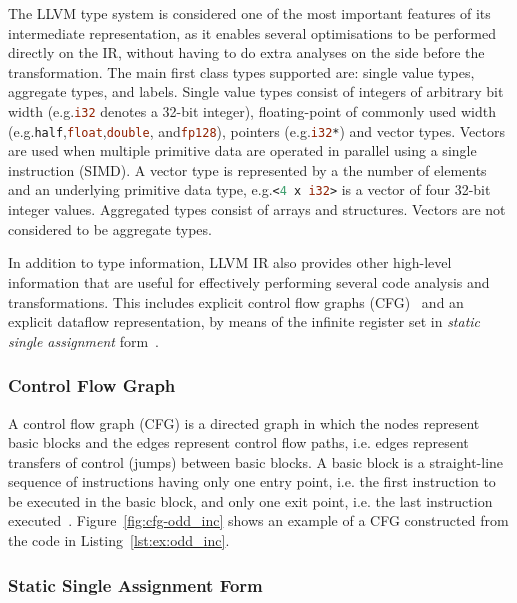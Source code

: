 The LLVM type system is considered one of the most important features of its intermediate representation, as it enables several optimisations to be performed directly on the IR, without having to do extra analyses on the side before the transformation.
The main first class types supported are: single value types, aggregate types, and labels.
Single value types consist of integers of arbitrary bit width (e.g.\lstinline[language=llvm,style=nasm]{i32} denotes a 32-bit integer), floating-point of commonly used width (e.g.\lstinline[language=llvm,style=nasm]{half},\lstinline[language=llvm,style=nasm]{float},\lstinline[language=llvm,style=nasm]{double}, and\lstinline[language=llvm,style=nasm]{fp128}), pointers (e.g.\lstinline[language=llvm,style=nasm]{i32*}) and vector types.
Vectors are used when multiple primitive data are operated in parallel using a single instruction (SIMD).
A vector type is represented by a the number of elements and an underlying primitive data type, e.g.\lstinline[language=llvm,style=nasm]{<4 x i32>} is a vector of four 32-bit integer values.
Aggregated types consist of arrays and structures.
Vectors are not considered to be aggregate types.

In addition to type information, LLVM IR also provides other high-level information that are useful for effectively performing several code analysis and transformations.
This includes explicit control flow graphs (CFG)~\citep{allen70} and an explicit dataflow representation, by means of the infinite register set in \textit{static single assignment} form~\citep{alpern88,cytron89,cytron91}.

\subsubsection{Control Flow Graph}

A control flow graph (CFG) is a directed graph in which the nodes represent basic blocks and the edges represent control flow paths, i.e. edges represent transfers of control (jumps) between basic blocks.
A basic block is a straight-line sequence of instructions having only one entry point, i.e. the first instruction to be executed in the basic block, and only one exit point, i.e. the last instruction executed~\citep{allen70,cytron91}.
Figure~\ref{fig:cfg-odd_inc} shows an example of a CFG constructed from the code in Listing~\ref{lst:ex:odd_inc}.

\subsubsection{Static Single Assignment Form}

